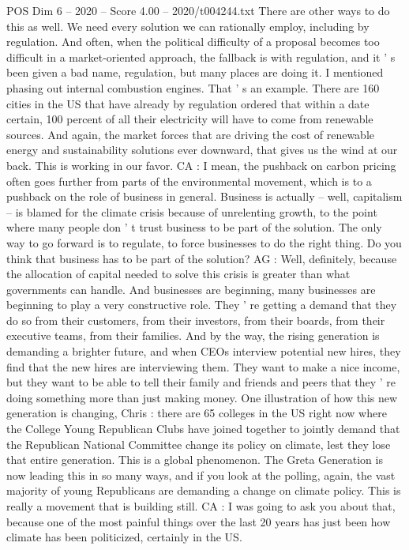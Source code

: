 \begin{textsample}{POS Dim 6 – 2020 – Score 4.00 – 2020/t004244.txt}
There are other ways to do this as well.
We need every solution we can rationally employ, including by regulation.
And often, when the political difficulty of a proposal becomes too difficult in a market-oriented approach, the fallback is with regulation, and it ' s been given a bad name, regulation, but many places are doing it.
I mentioned phasing out internal combustion engines.
That ' s an example.
There are 160 cities in the US that have already by regulation ordered that within a date certain, 100 percent of all their electricity will have to come from renewable sources.
And again, the market forces that are driving the cost of renewable energy and sustainability solutions ever downward, that gives us the wind at our back.
This is working in our favor.
CA : I mean, the pushback on carbon pricing often goes further from parts of the environmental movement, which is to a pushback on the role of business in general.
Business is actually -- well, capitalism -- is blamed for the climate crisis because of unrelenting growth, to the point where many people don ' t trust business to be part of the solution.
The only way to go forward is to regulate, to force businesses to do the right thing.
Do you think that business has to be part of the solution?
AG : Well, definitely, because the allocation of capital needed to solve this crisis is greater than what governments can handle.
And businesses are beginning, many businesses are beginning to play a very constructive role.
They ' re getting a demand that they do so from their customers, from their investors, from their boards, from their executive teams, from their families.
And by the way, the rising generation is demanding a brighter future, and when CEOs interview potential new hires, they find that the new hires are interviewing them.
They want to make a nice income, but they want to be able to tell their family and friends and peers that they ' re doing something more than just making money.
One illustration of how this new generation is changing, Chris : there are 65 colleges in the US right now where the College Young Republican Clubs have joined together to jointly demand that the Republican National Committee change its policy on climate, lest they lose that entire generation.
This is a global phenomenon.
The Greta Generation is now leading this in so many ways, and if you look at the polling, again, the vast majority of young Republicans are demanding a change on climate policy.
This is really a movement that is building still.
CA : I was going to ask you about that, because one of the most painful things over the last 20 years has just been how climate has been politicized, certainly in the US.

\end{textsample}
